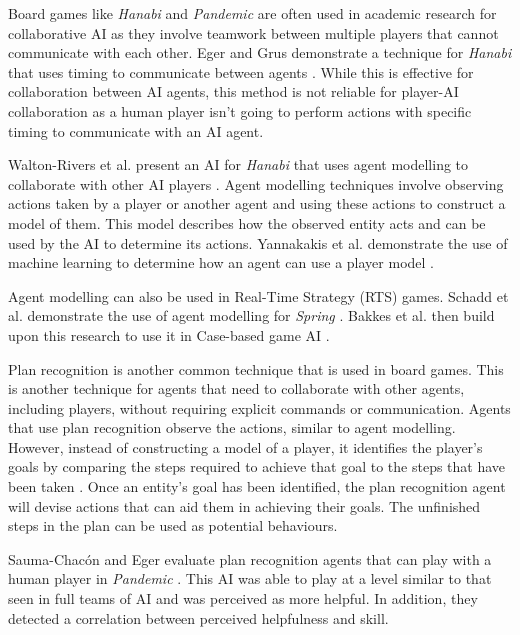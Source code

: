 \documentclass{IEEEtran}
\begin{document}
Board games like \textit{Hanabi} and \textit{Pandemic} are often used in academic research for collaborative AI as they involve teamwork between multiple players that cannot communicate with each other. Eger and Grus demonstrate a technique for \textit{Hanabi} that uses timing to communicate between agents \cite{WaitASecond2019}. While this is effective for collaboration between AI agents, this method is not reliable for player-AI collaboration as a human player isn't going to perform actions with specific timing to communicate with an AI agent.

Walton-Rivers et al. present an AI for \textit{Hanabi} that uses agent modelling to collaborate with other AI players \cite{EvaluatingHanabiAgents}. Agent modelling techniques involve observing actions taken by a player or another agent and using these actions to construct a model of them. This model describes how the observed entity acts and can be used by the AI to determine its actions. Yannakakis et al. demonstrate the use of machine learning to determine how an agent can use a player model \cite{yannakakis2013playermodelling}.

Agent modelling can also be used in Real-Time Strategy (RTS) games. Schadd et al. demonstrate the use of agent modelling for \textit{Spring} \cite{OpponentModellingRTS2007}. Bakkes et al. then build upon this research to use it in Case-based game AI \cite{bakkes2009opponentmodelling}.


Plan recognition is another common technique that is used in board games. This is another technique for agents that need to collaborate with other agents, including players, without requiring explicit commands or communication. Agents that use plan recognition observe the actions, similar to agent modelling. However, instead of constructing a model of a player, it identifies the player's goals by comparing the steps required to achieve that goal to the steps that have been taken \cite{GeneratingCollabBehaviourPlanRecognition2016}. Once an entity’s goal has been identified, the plan recognition agent will devise actions that can aid them in achieving their goals. The unfinished steps in the plan can be used as potential behaviours.

Sauma-Chacón and Eger evaluate plan recognition agents that can play with a human player in \textit{Pandemic} \cite{PandemicPlanRecognition2021}. This AI was able to play at a level similar to that seen in full teams of AI and was perceived as more helpful. In addition, they detected a correlation between perceived helpfulness and skill.
\end{document}
